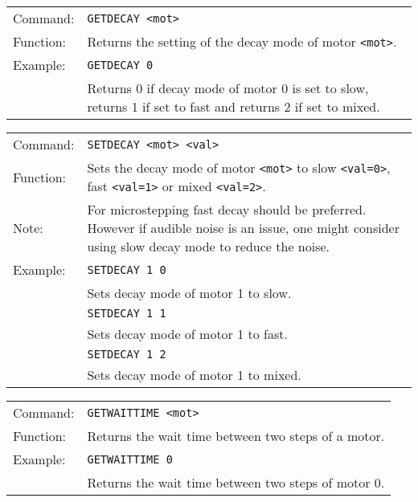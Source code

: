 \vspace{\vdistace}

\begin{table}[!htbp]
  \begin{tabularx}{\textwidth}{lX}
    Command:  & \texttt{GETDECAY <mot>}\\
    Function: & Returns the setting of the decay mode of motor \texttt{<mot>}.\\
    Example:  & \texttt{GETDECAY 0}\\
              & Returns 0 if decay mode of motor 0 is set to slow, returns 1 if set to fast and returns 2 if set to mixed.
  \end{tabularx}
\end{table}

\vspace{\vdistace}

\begin{table}[!htbp]
  \begin{tabularx}{\textwidth}{lX}
    Command:  & \texttt{SETDECAY <mot> <val>}\\
    Function: & Sets the decay mode of motor \texttt{<mot>} to slow \texttt{<val=0>}, fast \texttt{<val=1>} or mixed \texttt{<val=2>}.\\
    Note:     & For microstepping fast decay should be preferred. However if audible noise is an issue, one might consider using slow decay mode to reduce the noise.\\
    Example:  & \texttt{SETDECAY 1 0}\\
              & Sets decay mode of motor 1 to slow.\\
              & \texttt{SETDECAY 1 1}\\
              & Sets decay mode of motor 1 to fast.\\
              & \texttt{SETDECAY 1 2}\\
              & Sets decay mode of motor 1 to mixed.
  \end{tabularx}
\end{table}

\vspace{\vdistace}

\begin{table}[!htbp]
  \begin{tabularx}{\textwidth}{lX}
    Command:  & \texttt{GETWAITTIME <mot>}\\
    Function: & Returns the wait time between two steps of a motor.\\
    Example:  & \texttt{GETWAITTIME 0}\\
              & Returns the wait time between two steps of motor 0.
  \end{tabularx}
\end{table}

